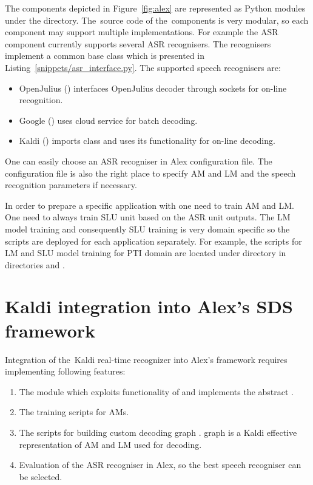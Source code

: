 The components depicted in Figure~\ref{fig:alex} are represented as Python modules under the  directory.
The~source code of the~components is very modular, so each component may support multiple implementations.
For example the \ac{ASR} component currently supports several \ac{ASR} recognisers.
The recognisers implement a common base class  which is presented in Listing~\ref{snippets/asr_interface.py}.
The supported speech recognisers are:
\begin{itemize}
    \item OpenJulius () interfaces OpenJulius decoder through sockets for on-line recognition.
    \item Google () uses cloud service for batch decoding.
    \item Kaldi () imports  class and uses its functionality for on-line decoding.
\end{itemize}

One can easily choose an \ac{ASR} recogniser in Alex configuration file.
The configuration file is also the right place to specify \ac{AM} and \ac{LM} and the speech recognition parameters if necessary.

In order to prepare a specific application with  one need to train \ac{AM} and \ac{LM}.
One need to always train \ac{SLU} unit based on the \ac{ASR} unit outputs.
The \ac{LM} model training and consequently \ac{SLU} training is very domain specific so the scripts are deployed for each application separately.
For example, the scripts for \ac{LM} and \ac{SLU} model training for \ac{PTI} domain are located under directory  in directories  and .

\section[Kaldi integration into \acs{SDS} framework]{Kaldi integration into Alex's \acl{SDS} framework}
\label{sec:asrsds}

Integration of the~Kaldi real-time recognizer into Alex's framework requires implementing following features:
\begin{enumerate}
    \item The  module which exploits functionality of  and implements the abstract .
    \item The training scripts for \acp{AM}.
        \item The scripts for building custom decoding graph . graph is a Kaldi effective representation of \ac{AM} and \ac{LM} used for decoding. 
    \item Evaluation of the \ac{ASR} recogniser in Alex, so the best speech recogniser can be selected.
\end{enumerate}

